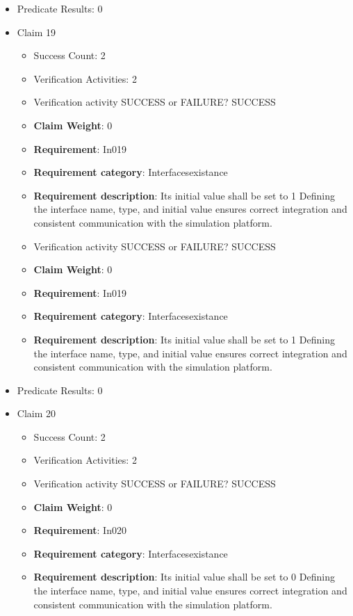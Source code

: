 \documentclass{article}
\begin{document}
\begin{itemize}
									    
				\item Predicate Results: 0

  				  \item Claim 19
				\begin{itemize}
			    	\item Success Count: 2 
			    	\item Verification Activities: 2
					\item Verification activity SUCCESS or FAILURE? SUCCESS
					\item \textbf{Claim Weight}: 0
						\item \textbf{Requirement}: In019 
						\item \textbf{Requirement category}: Interfacesexistance 
						\item \textbf{Requirement description}: Its initial value shall be set to 1 Defining the interface name, type, and initial value ensures correct integration and consistent communication with the simulation platform.
					
					\item Verification activity SUCCESS or FAILURE? SUCCESS
					\item \textbf{Claim Weight}: 0
						\item \textbf{Requirement}: In019 
						\item \textbf{Requirement category}: Interfacesexistance 
						\item \textbf{Requirement description}: Its initial value shall be set to 1 Defining the interface name, type, and initial value ensures correct integration and consistent communication with the simulation platform.
					
				\end{itemize}
				
									    
				\item Predicate Results: 0

  				  \item Claim 20
				\begin{itemize}
			    	\item Success Count: 2 
			    	\item Verification Activities: 2
					\item Verification activity SUCCESS or FAILURE? SUCCESS
					\item \textbf{Claim Weight}: 0
						\item \textbf{Requirement}: In020 
						\item \textbf{Requirement category}: Interfacesexistance 
						\item \textbf{Requirement description}: Its initial value shall be set to 0 Defining the interface name, type, and initial value ensures correct integration and consistent communication with the simulation platform.
					

\end{itemize}
\end{itemize}
\end{document}
